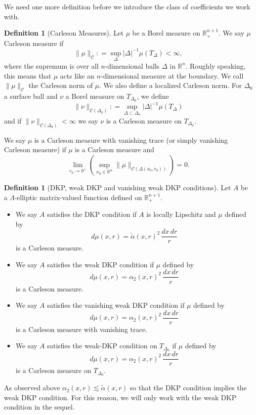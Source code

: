 \documentclass[11pt, a4paper,leqno]{amsart}
\theoremstyle{plain}
\theoremstyle{definition}
\newtheorem{definition}[equation]{Definition}
\theoremstyle{remark}
\numberwithin{equation}{section}
\newcommand{\rn}{\mathbb{R}^n}
\newcommand{\ree}{\mathbb{R}^{n+1}}
\begin{document}
We need one more definition before we introduce the class of coefficients we work with.
\begin{definition}[Carleson Measures]\label{def:Carl}
Let $\mu$ be a Borel measure on $\ree_+$. We say $\mu$ Carleson measure if
\[\|\mu\|_{\mathcal{C}}: = \sup_{\Delta} |\Delta|^{-1} \mu(T_\Delta) < \infty,\]
where the supremum is over all $n$-dimensional balls $\Delta$ in $\rn$.
Roughly speaking, this means that $\mu$ acts like an $n$-dimensional measure at the boundary. We call $\|\mu\|_{\mathcal{C}}$ the Carleson norm of $\mu$. We also define a localized Carleson norm. For $\Delta_0$ a surface ball and $\nu$ a Borel measure on $T_{\Delta_0}$, we define
\[\|\nu\|_{\mathcal{C}(\Delta_0)} : = \sup_{\Delta \subset \Delta_0} |\Delta|^{-1} \mu(T_\Delta)\]
and if $\|\nu\|_{\mathcal{C}(\Delta_0)}  < \infty$ we say $\nu$ is a Carleson measure on $T_{\Delta_0}$.

We say $\mu$ is a Carleson measure with vanishing trace (or simply vanishing Carleson measure) if $\mu$ is a Carleson measure and
\begin{equation}\label{def:vCarl}
	\lim_{r_0 \to 0^+} (\sup_{x_0 \in \rn} \|\mu\|_{\mathcal{C}(\Delta(x_0,r_0))}) = 0.
\end{equation} 
\end{definition}

\begin{definition}[DKP, weak DKP and vanishing weak DKP conditions]\label{DKPconditions.def}
Let $A$ be a $\Lambda$-elliptic matrix-valued function defined on $\ree_+$. 
\begin{itemize}
\item We say $A$ satisfies the DKP condition if $A$ is locally Lipschitz and $\mu$ defined by 
\[d\mu(x,r) = \tilde{\alpha}(x,r)^2 \, \frac{dx \, dr}{r}\]
is a Carleson measure.
\item We say $A$ satisfies the weak DKP condition if $\mu$ defined by 
\[d\mu(x,r) = \alpha_2(x,r)^2 \, \frac{dx \, dr}{r}\]
is a Carleson measure.
\item We say $A$ satisfies the vanishing weak DKP condition if $\mu$ defined by 
\[d\mu(x,r) = \alpha_2(x,r)^2 \, \frac{dx \, dr}{r}\]
is a Carleson measure with vanishing trace.
\item  We say $A$ satisfies the weak-DKP condition on $T_{\Delta_0}$ if $\mu$ defined by 
\[d\mu(x,r) = \alpha_2(x,r)^2 \, \frac{dx \, dr}{r}\]
is a Carleson measure on $T_{\Delta_0}$.
\end{itemize}
As observed above $\alpha_2(x,r) \lesssim \tilde{\alpha}(x,r)$ so that the DKP condition implies the weak DKP condition. %
For this reason, we will only work with the weak DKP condition in the sequel.
\end{definition}
\end{document}
